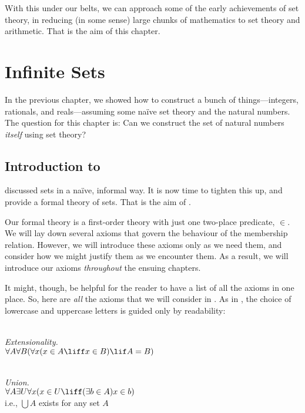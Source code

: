 With this under our belts, we can approach some of the early
achievements of set theory, in reducing (in some sense) large chunks
of mathematics to set theory and arithmetic. That is the aim of this
chapter.


\chapter{Infinite Sets}

In the previous chapter, we showed how to construct a bunch of
things---integers, rationals, and reals---assuming some na\"{i}ve set
theory and the natural numbers. The question for this chapter is: Can
we construct the set of natural numbers \emph{itself} using set
theory?

\olresetchapter

\OLEndPartHook


\section*{Introduction to }

 discussed sets in a na\"{i}ve, informal way. It
is now time to tighten this up, and provide a formal theory of sets.
That is the aim of . 

Our formal theory is a first-order theory with just one two-place
predicate, $\in$. We will lay down several axioms that govern the
behaviour of the membership relation. However, we will introduce these
axioms only as we need them, and consider how we might justify them as
we encounter them. As a result, we will introduce our axioms
\emph{throughout} the ensuing chapters.

It might, though, be helpful for the reader to have a list of all the
axioms in one place. So, here are \emph{all} the axioms that we will
consider in . As in , the
choice of lowercase and uppercase letters is guided only by
readability:

\
\\\emph{Extensionality.} 
\\$\forall A \forall B(\forall x(x \in A \liff x \in B) \lif A = B)$

\
\\\emph{Union.} 
\\$\forall A \exists U \forall x(x \in U \liff (\exists b \in A)x \in b)$
\\i.e., $\bigcup A$ exists for any set $A$

